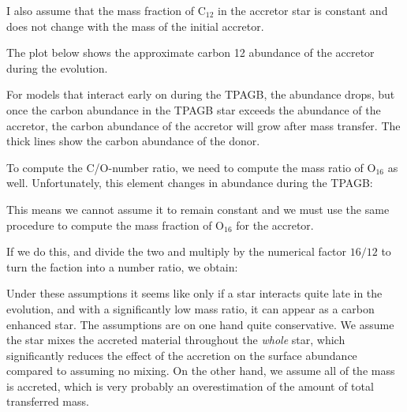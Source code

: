\documentclass[a4paper,10pt]{article}
\begin{document}
I also assume that the mass fraction of \(\text{C}_{12}\) in the accretor star is constant and does not change with the mass of the initial accretor. 

The plot below shows the approximate carbon 12 abundance of the accretor during the evolution.
\begin{figure}[ht]
    \centering
\end{figure}

For models that interact early on during the TPAGB, the abundance drops, but once the carbon abundance in the TPAGB star exceeds the abundance of the accretor, the carbon abundance of the accretor will grow after mass transfer. The thick lines show the carbon abundance of the donor.

To compute the C/O-number ratio, we need to compute the mass ratio of \(\text{O}_\text{16}\) as well. Unfortunately, this element changes in abundance during the TPAGB:

\begin{figure}[ht]
    \centering
\end{figure}

This means we cannot assume it to remain constant and we must use the same procedure to compute the mass fraction of \(\text{O}_{16}\) for the accretor.

If we do this, and divide the two and multiply by the numerical factor \(16 / 12\) to turn the faction into a number ratio, we obtain:

\begin{figure}[ht]
    \centering
\end{figure}

Under these assumptions it seems like only if a star interacts quite late in the evolution, and with a significantly low mass ratio, it can appear as a carbon enhanced star. The assumptions are on one hand quite conservative. We assume the star mixes the accreted material throughout the \emph{whole} star, which significantly reduces the effect of the accretion on the surface abundance compared to assuming no mixing. On the other hand, we assume  all of the mass is accreted, which is very probably an overestimation of the amount of total transferred mass.
\end{document}
